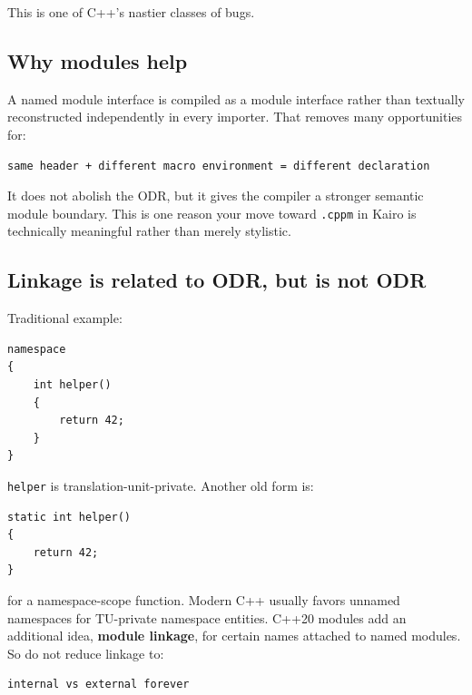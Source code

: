 This is one of C++'s nastier classes of bugs.

\subsection{Why modules help}\label{05-engine-i-ch002-why-modules-help}

\hypertarget{05-engine-i-ch002-why-modules-help}{}

A named module interface is compiled as a module interface rather than textually reconstructed independently in every importer. That removes many opportunities for:

\begin{verbatim}
same header + different macro environment = different declaration
\end{verbatim}

It does not abolish the ODR, but it gives the compiler a stronger semantic module boundary. This is one reason your move toward \texttt{.cppm} in Kairo is technically meaningful rather than merely stylistic.

\subsection{Linkage is related to ODR, but is not ODR}\label{05-engine-i-ch002-linkage-is-related-to-odr-but-is-not-odr}

\hypertarget{05-engine-i-ch002-linkage-is-related-to-odr-but-is-not-odr}{}

Traditional example:

\begin{verbatim}
namespace
{
    int helper()
    {
        return 42;
    }
}
\end{verbatim}

\texttt{helper} is translation-unit-private. Another old form is:

\begin{verbatim}
static int helper()
{
    return 42;
}
\end{verbatim}

for a namespace-scope function. Modern C++ usually favors unnamed namespaces for TU-private namespace entities. C++20 modules add an additional idea, \textbf{module linkage}, for certain names attached to named modules. So do not reduce linkage to:

\begin{verbatim}
internal vs external forever
\end{verbatim}

